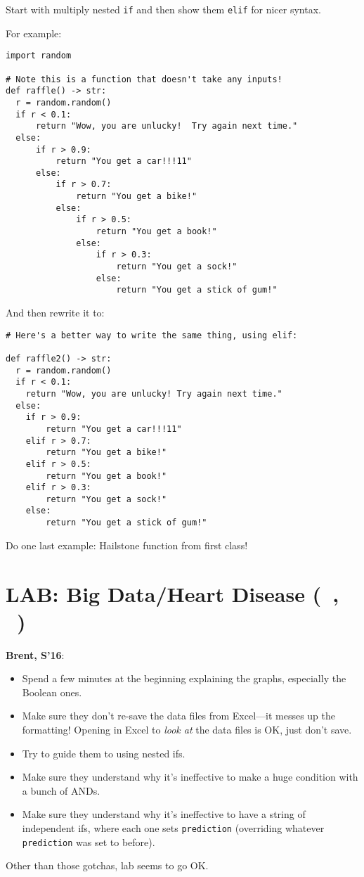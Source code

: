 \documentclass{article}
\newenvironment{reflect}[1]
{
  \noindent
  \begin{lrbox}{\reflectbox}
    \begin{minipage}[t]{\textwidth}
      \textbf{#1}:
}{
    \end{minipage}
  \end{lrbox}
  \fbox{\usebox{\reflectbox}}
}
\newcommand{\shortmonthname}{\StrLeft{\datemonthname}{3}}
\newcommand{\showdate}{\thedateday\ \shortmonthname}
\newcommand{\lab}[1]{\section*{LAB: #1 (\showdate\nextdate, \showdate)}}
\begin{document}
Start with multiply nested {\tt if} and then show them {\tt elif} for
nicer syntax.

For example:
\begin{verbatim}
import random

# Note this is a function that doesn't take any inputs!
def raffle() -> str:
  r = random.random()
  if r < 0.1:
      return "Wow, you are unlucky!  Try again next time."
  else:
      if r > 0.9:
          return "You get a car!!!11"
      else:
          if r > 0.7:
              return "You get a bike!"
          else:
              if r > 0.5:
                  return "You get a book!"
              else:
                  if r > 0.3:
                      return "You get a sock!"
                  else:
                      return "You get a stick of gum!"
\end{verbatim}

And then rewrite it to:
\begin{verbatim}
# Here's a better way to write the same thing, using elif:

def raffle2() -> str:
  r = random.random()
  if r < 0.1:
    return "Wow, you are unlucky! Try again next time."
  else:
    if r > 0.9:
        return "You get a car!!!11"
    elif r > 0.7:
        return "You get a bike!"
    elif r > 0.5:
        return "You get a book!"
    elif r > 0.3:
        return "You get a sock!"
    else:
        return "You get a stick of gum!"
\end{verbatim}

Do one last example: Hailstone function from first class!

\newpage
\lab{Big Data/Heart Disease}

\begin{reflect}{Brent, S'16}
  \begin{itemize}
  \item Spend a few minutes at the beginning explaining the graphs,
    especially the Boolean ones.
  \item Make sure they don't re-save the data files from Excel---it
    messes up the formatting!  Opening in Excel to \emph{look at} the
    data files is OK, just don't save.
  \item Try to guide them to using nested ifs.
  \item Make sure they understand why it's ineffective to make a huge
    condition with a bunch of ANDs.
  \item Make sure they understand why it's ineffective to have a
    string of independent ifs, where each one sets \texttt{prediction}
    (overriding whatever \texttt{prediction} was set to before).
  \end{itemize}

  Other than those gotchas, lab seems to go OK.
\end{reflect}
\end{document}
